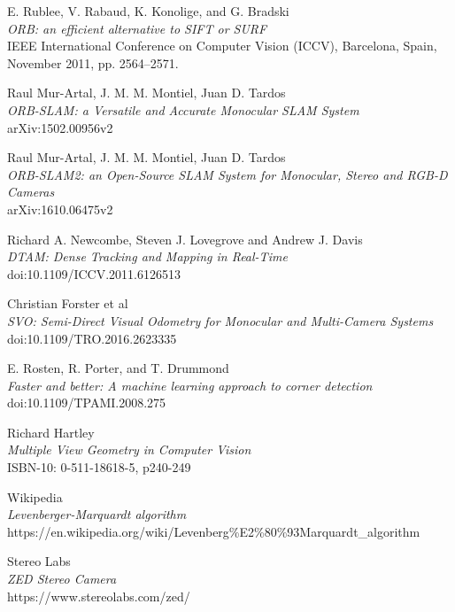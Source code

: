 \documentclass[11pt,a4paper,titlepage,oneside]{report}
\begin{document}
\listoffigures
 
\begin{thebibliography}{1}

	E. Rublee, V. Rabaud, K. Konolige, and G. Bradski\\
	\textit{ORB: an efficient alternative to SIFT or SURF}\\
	IEEE International Conference on Computer Vision (ICCV), Barcelona, Spain, November 2011, pp. 2564–2571.

  Raul Mur-Artal, J. M. M. Montiel, Juan D. Tardos\\
  \textit{ORB-SLAM: a Versatile and Accurate Monocular SLAM System}\\
  arXiv:1502.00956v2

  Raul Mur-Artal, J. M. M. Montiel, Juan D. Tardos\\
  \textit{ORB-SLAM2: an Open-Source SLAM System for Monocular, Stereo and RGB-D Cameras}\\
	arXiv:1610.06475v2 

	Richard A. Newcombe, Steven J. Lovegrove and Andrew J. Davis\\
	\textit{DTAM: Dense Tracking and Mapping in Real-Time}\\
	doi:10.1109/ICCV.2011.6126513

	Christian Forster et al\\
	\textit{SVO: Semi-Direct Visual Odometry for Monocular and Multi-Camera Systems}\\
	doi:10.1109/TRO.2016.2623335

	E. Rosten, R. Porter, and T. Drummond \\
	\textit{Faster and better: A machine learning approach to corner detection}\\
	doi:10.1109/TPAMI.2008.275

	Richard Hartley\\
	\textit{Multiple View Geometry in Computer Vision}\\
	ISBN-10: 0-511-18618-5, p240-249

	Wikipedia\\
	\textit{Levenberger-Marquardt algorithm}\\
	https://en.wikipedia.org/wiki/Levenberg\%E2\%80\%93Marquardt\_algorithm

	Stereo Labs\\
	\textit{ZED Stereo Camera}\\
	https://www.stereolabs.com/zed/


\end{thebibliography}
\end{document}
